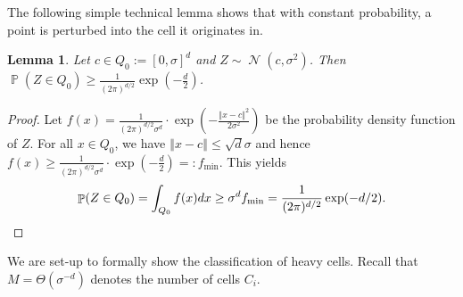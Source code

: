 \documentclass[11pt,DIV=12,a4paper]{scrartcl}
\newtheorem{lemma}[claim]{Lemma}
\DeclareMathOperator{\probab}{\mathbb{P}}
\newcommand{\norm}[1]{\left\Vert #1 \right\Vert}
\DeclareMathOperator{\Gauss}{\mathcal{N}}
\begin{document}

The following simple technical lemma shows that with constant probability, a point is perturbed into the cell it originates in.

\begin{lemma}\label{lem:IntoOwnSquare}
Let $c\in Q_0 := [0,\sigma]^d$ and $Z \sim \Gauss(c,\sigma^2)$. Then $\probab(Z\in Q_0) \ge \frac{1}{(2\pi)^{d/2}}\exp(-\frac{d}{2})$.
\end{lemma}
\begin{proof}
Let $f(x)=\frac{1}{(2\pi)^{d/2}\sigma^d}\cdot \exp(-\frac{\norm{x-c}^2}{2\sigma^2})$ be the probability density function of $Z$. For all $x\in Q_0$, we have $\norm{x-c} \le \sqrt{d}\sigma$ and hence $f(x) \ge \frac{1}{(2\pi)^{d/2}\sigma^d}\cdot \exp(-\frac{d}{2})=: f_{\mathrm{min}}$. This yields 
\[\probab(Z\in Q_0) = \int_{Q_0} f(x) dx \ge \sigma^d  f_{\mathrm{min}} = \frac{1}{(2\pi)^{d/2}}\exp(-d/2).\qedhere\]
\end{proof}

We are set-up to formally show the classification of heavy cells. Recall that $M = \Theta(\sigma^{-d})$ denotes the number of cells $C_i$.
\end{document}
